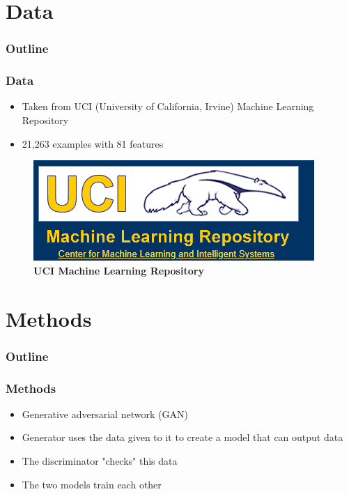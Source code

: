 \documentclass[12pt]{beamer}
\begin{document}
\section{Data}
\begin{frame}
\frametitle{Outline}
\tableofcontents[currentsection]
\end{frame}

\begin{frame}
\frametitle{Data}

\begin{itemize}
  \item Taken from UCI (University of California, Irvine) Machine Learning Repository
  \pause
  \item 21,263 examples with 81 features
  \pause
\end{itemize}

\begin{figure}[h]
  \includegraphics[scale = 0.5]{UCIRepo.png}
  \caption{\textbf{UCI Machine Learning Repository}}
\end{figure}

\end{frame}



\section{Methods}
\begin{frame}
\frametitle{Outline}
\tableofcontents[currentsection]
\end{frame}



\begin{frame}
\frametitle{Methods}

\pause
\begin{itemize}
    \item Generative adversarial network (GAN)
    \pause
    \item Generator uses the data given to it to create a model that can output data
    \pause
    \item The discriminator "checks" this data
    \pause
    \item The two models train each other
    \pause
\end{itemize}



\end{frame}
\end{document}
